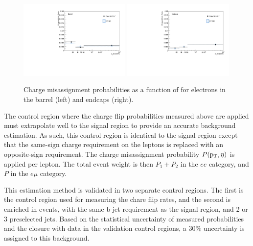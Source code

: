 \begin{figure}[htp]
\centering
\includegraphics[width=0.49\textwidth]{ch8_figs/chmid_prob_barrel.pdf}
\includegraphics[width=0.49\textwidth]{ch8_figs/chmid_prob_endcap.pdf}\\
\caption[Electron charge misassignment probabilities in data and MC.]{Charge misassignment probabilities as a function of \pt for electrons in the barrel (left) and endcaps (right).}
\label{fig:fliprate}
\end{figure}
 
The control region where the charge flip probabilities measured above are applied must extrapolate well to the signal region to provide an accurate background estimation. As such, this control region
is identical to the signal region except that the same-sign charge requirement on the leptons is replaced with an opposite-sign requirement.
The charge misassignment probability $P(\mathrm{p}_{\mathrm{T}},\eta)$ is applied per lepton. The total event weight is then $P_{1} + P_{2}$ in the $ee$ category, and $P$ in the $e\mu$ category.  

This estimation method is validated in two separate control regions. The first is the control region used for measuring the chare flip rates, and the second is enriched in \ttbar events, with the same b-jet
requirement as the signal region, and 2 or 3 preselected jets. Based on the statistical uncertainty of measured probabilities and the closure with data in the validation control regions, a 30$\%$ uncertainty
is assigned to this background. 

